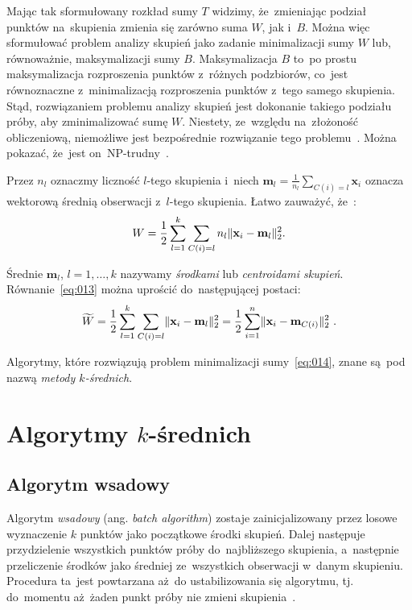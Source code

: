 \documentclass{praca1}
\DeclarePairedDelimiter{\norm}{\lVert}{\rVert}
\begin{document}
Mając tak sformułowany rozkład sumy $T$ widzimy, że~zmieniając podział punktów na~skupienia zmienia się zarówno suma $W$, jak i~$B$. Można więc sformułować problem analizy skupień jako zadanie minimalizacji sumy $W$ lub, równoważnie, maksymalizacji sumy $B$. Maksymalizacja $B$ to~po prostu maksymalizacja rozproszenia punktów z~różnych podzbiorów, co~jest równoznaczne z~minimalizacją rozproszenia punktów z~tego samego skupienia. Stąd, rozwiązaniem problemu analizy skupień jest dokonanie takiego podziału próby, aby zminimalizować sumę $W$. Niestety, ze~względu na~złożoność obliczeniową, niemożliwe jest bezpośrednie rozwiązanie tego problemu~\cite{Koronacki2005:statystyczne}. Można pokazać, że~jest on~NP-trudny~\cite{Aloise2009:np}.

Przez $n_l$ oznaczmy liczność $l$-tego skupienia i~niech $\mathbf{m}_l = \frac{1}{n_l} \sum\limits_{C(i) = l} \mathbf{x}_i$ oznacza wektorową średnią obserwacji z~$l$-tego skupienia. Łatwo zauważyć, że~\cite{Koronacki2005:statystyczne}:
\begin{equation}
\label{eq:013}
W = \frac{1}{2}\sum\limits_{l=1}^{k}\sum\limits_{C(i) = l} n_l \norm{\mathbf{x}_i - \mathbf{m}_l}_2^2.
\end{equation}

Średnie $\mathbf{m}_l$, $l = 1,\ldots, k$ nazywamy \emph{środkami} lub \emph{centroidami skupień}. Równanie~\eqref{eq:013} można uprościć do~następującej postaci:
\begin{equation}
\label{eq:014}
\widetilde{W} = \frac{1}{2}\sum\limits_{l=1}^{k}\sum\limits_{C(i) = l} \norm{\mathbf{x}_i - \mathbf{m}_l}_2^2 = \frac{1}{2}\sum\limits_{i=1}^{n} \norm{\mathbf{x}_i - \mathbf{m}_{C(i)}}_2^2\ .
\end{equation}

Algorytmy, które rozwiązują problem minimalizacji sumy~\eqref{eq:014}, znane są~pod nazwą \emph{metody $k$-średnich}.

\section{Algorytmy $k$-średnich}

\subsection{Algorytm wsadowy}


Algorytm \emph{wsadowy} (ang. \emph{batch algorithm}) zostaje zainicjalizowany przez losowe wyznaczenie $k$ punktów jako początkowe środki skupień. Dalej następuje przydzielenie wszystkich punktów próby do~najbliższego skupienia, a~następnie przeliczenie środków jako średniej ze~wszystkich obserwacji w~danym skupieniu. Procedura ta~jest powtarzana aż~do ustabilizowania się algorytmu, tj. do~momentu aż~żaden punkt próby nie zmieni skupienia~\cite{Wu2007:topten}.
\end{document}

